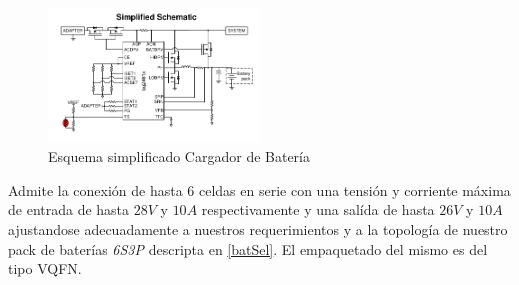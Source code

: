 \documentclass[10pt,a4paper]{article}
\begin{document}
\begin{itemize}
\begin{figure}[h!]
    \centering
    \includegraphics[width=0.5\textwidth]{bat_char/simp_sch_char.png}
    \caption{Esquema simplificado Cargador de Batería}
    \label{fig:simp_sch_char}
\end{figure}
\FloatBarrier

Admite la conexión de hasta 6 celdas en serie con una tensión y
corriente máxima de entrada de hasta $28V$ y $10A$ respectivamente y una salída
de hasta $26V$ y $10A$ ajustandose adecuadamente a nuestros requerimientos y a
la topología de nuestro pack de baterías \emph{6S3P} descripta en \ref{batSel}.
El empaquetado del mismo es del tipo VQFN.

%
%


\end{itemize}
\end{document}
